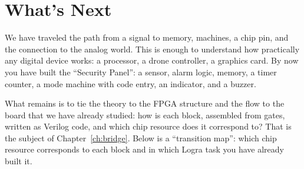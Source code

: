 \section{What's Next}

We have traveled the path from a signal to memory, machines, a chip pin, and the connection to the
analog world. This is enough to understand how practically
any digital device works: a processor, a drone controller, a graphics card. By
now you have built the ``Security Panel'': a sensor, alarm logic, memory,
a timer counter, a mode machine with code entry, an indicator, and a buzzer.

What remains is to tie the theory to the FPGA structure and the flow to the
board that we have already studied: how is each block, assembled from gates,
written as Verilog code, and which chip resource does it correspond to? That is
the subject of Chapter~\ref{ch:bridge}. Below is a ``transition map'': which chip
resource corresponds to each block and in which Logra task you have already built it.

